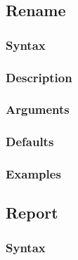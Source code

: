 \documentclass[11pt]{article}
\begin{document}
	
	\subsection{Rename}
		\subsubsection{Syntax}
		\subsubsection{Description}
		\subsubsection{Arguments}
		\subsubsection{Defaults}
		\subsubsection{Examples}
	
	\subsection{Report}
		\subsubsection{Syntax}
\end{document}
